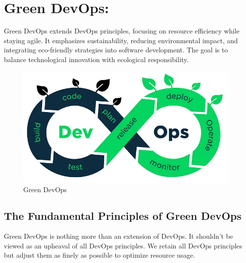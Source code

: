 \section{Green DevOps:}
Green DevOps extends DevOps principles, focusing on resource efficiency while staying agile. It emphasizes sustainability, reducing environmental impact, and integrating eco-friendly strategies into software development. The goal is to balance technological innovation with ecological responsibility.
\begin{figure}[H]
  \centering
  \includegraphics[width=16cm]{Figures/devgreenops.png}
  \caption{Green DevOps}
\end{figure}
\subsection{The Fundamental Principles of Green DevOps}
Green DevOps is nothing more than an extension of DevOps. It shouldn't be viewed as an upheaval of all DevOps principles. We retain all DevOps principles but adjust them as finely as possible to optimize resource usage.

